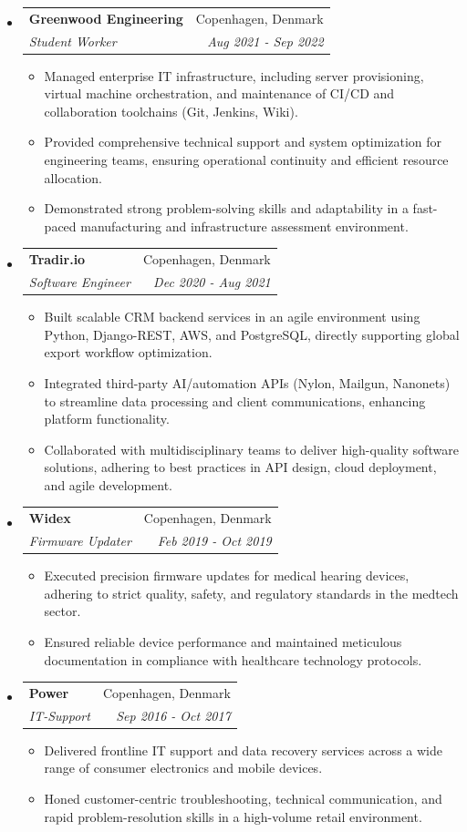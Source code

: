 \documentclass[letterpaper,11pt]{article}
\makeatletter
\newcommand{\resitem}[1]{\item #1 \vspace{-2pt}}
\newcommand{\ressubheading}[4]{
    \begin{tabular*}{6.5in}{p{4.8in}@{\extracolsep{\fill}}r}
            \textbf{#1} & #2 \\
            \textit{#3} & \textit{#4} \\
    \end{tabular*}\vspace{-8pt}}
\makeatother
\begin{document}
\begin{itemize}
\begin{itemize}
        \end{itemize}
        \item \ressubheading{Greenwood Engineering}{Copenhagen, Denmark}{Student Worker}{Aug 2021 - Sep 2022}
        \begin{itemize}
            \resitem{Managed enterprise IT infrastructure, including server provisioning, virtual machine orchestration, and maintenance of CI/CD and collaboration toolchains (Git, Jenkins, Wiki).}
            \resitem{Provided comprehensive technical support and system optimization for engineering teams, ensuring operational continuity and efficient resource allocation.}
            \resitem{Demonstrated strong problem-solving skills and adaptability in a fast-paced manufacturing and infrastructure assessment environment.}
        \end{itemize}
        \item \ressubheading{Tradir.io}{Copenhagen, Denmark}{Software Engineer}{Dec 2020 - Aug 2021}
        \begin{itemize}
            \resitem{Built scalable CRM backend services in an agile environment using Python, Django-REST, AWS, and PostgreSQL, directly supporting global export workflow optimization.}
            \resitem{Integrated third-party AI/automation APIs (Nylon, Mailgun, Nanonets) to streamline data processing and client communications, enhancing platform functionality.}
            \resitem{Collaborated with multidisciplinary teams to deliver high-quality software solutions, adhering to best practices in API design, cloud deployment, and agile development.}
        \end{itemize}
        \item \ressubheading{Widex}{Copenhagen, Denmark}{Firmware Updater}{Feb 2019 - Oct 2019}
        \begin{itemize}
            \resitem{Executed precision firmware updates for medical hearing devices, adhering to strict quality, safety, and regulatory standards in the medtech sector.}
            \resitem{Ensured reliable device performance and maintained meticulous documentation in compliance with healthcare technology protocols.}
        \end{itemize}
        \item \ressubheading{Power}{Copenhagen, Denmark}{IT-Support}{Sep 2016 - Oct 2017}
        \begin{itemize}
            \resitem{Delivered frontline IT support and data recovery services across a wide range of consumer electronics and mobile devices.}
            \resitem{Honed customer-centric troubleshooting, technical communication, and rapid problem-resolution skills in a high-volume retail environment.}
        \end{itemize}
      \end{itemize}
\end{document}
